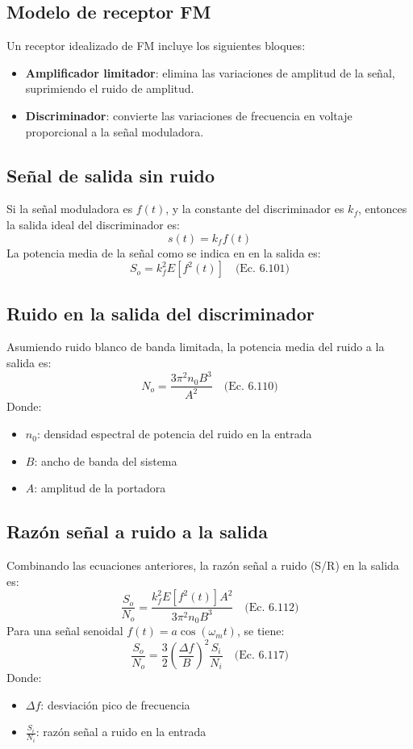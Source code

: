 \documentclass[conference]{IEEEtran}
\begin{document}
	\subsection*{Modelo de receptor FM}
	Un receptor idealizado de FM incluye los siguientes bloques:
	\begin{itemize}
		\item \textbf{Amplificador limitador}: elimina las variaciones de amplitud de la señal, suprimiendo el ruido de amplitud.
		\item \textbf{Discriminador}: convierte las variaciones de frecuencia en voltaje proporcional a la señal moduladora.
	\end{itemize}
	\subsection*{Señal de salida sin ruido}
	Si la señal moduladora es \( f(t) \), y la constante del discriminador es \( k_f \), entonces la salida ideal del discriminador es:
	\[
	s(t) = k_f f(t)
	\]
	La potencia media de la señal como se indica en \cite{lazaro_teoria_telecom} en la salida es:
	\[
	S_o = k_f^2 E[f^2(t)]
	\quad \text{(Ec. 6.101)}
	\]
	\subsection*{Ruido en la salida del discriminador}
	Asumiendo ruido blanco de banda limitada, la potencia media del ruido a la salida es:
	\[
	N_o = \frac{3\pi^2 n_0 B^3}{A^2}
	\quad \text{(Ec. 6.110)}
	\]
	Donde:
	\begin{itemize}
		\item \( n_0 \): densidad espectral de potencia del ruido en la entrada
		\item \( B \): ancho de banda del sistema
		\item \( A \): amplitud de la portadora
	\end{itemize}
	\subsection*{Razón señal a ruido a la salida}
	Combinando las ecuaciones anteriores, la razón señal a ruido (S/R) en la salida es:
	\[
	\frac{S_o}{N_o} = \frac{k_f^2 E[f^2(t)] A^2}{3\pi^2 n_0 B^3}
	\quad \text{(Ec. 6.112)}
	\]
	Para una señal senoidal \( f(t) = a \cos(\omega_m t) \), se tiene:
	\[
	\frac{S_o}{N_o} = \frac{3}{2} \left(\frac{\Delta f}{B}\right)^2 \frac{S_i}{N_i}
	\quad \text{(Ec. 6.117)}
	\]
	Donde:
	\begin{itemize}
		\item \( \Delta f \): desviación pico de frecuencia
		\item \( \frac{S_i}{N_i} \): razón señal a ruido en la entrada
	\end{itemize}
	
\end{document}
